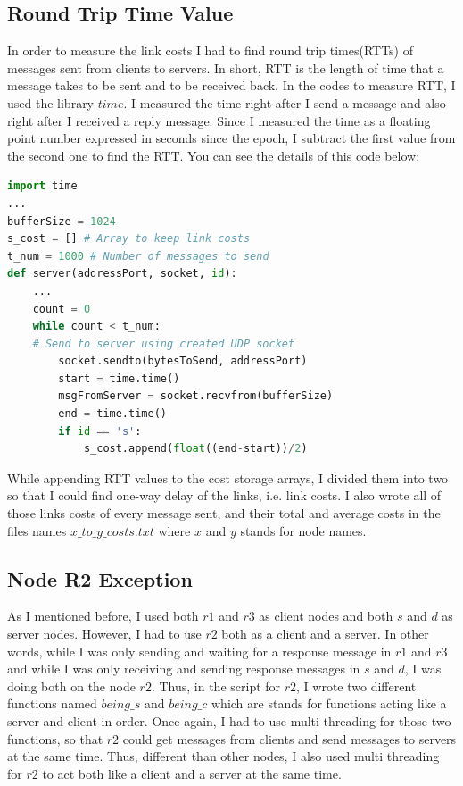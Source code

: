 \documentclass[conference]{IEEEtran}
\begin{document}
\subsection{Round Trip Time Value}
In order to measure the link costs I had to find round trip times(RTTs) of messages sent from clients to servers. In short, RTT is the length of time that a message takes to be sent and to be received back. In the codes to measure RTT, I used the library $time$. I measured the time right after I send a message and also right after I received a reply message. Since I measured the time as a floating point number expressed in seconds since the epoch, I subtract the first value from the second one to find the RTT. You can see the details of this code below:
\begin{lstlisting}[language=Python, caption=Finding RTT in Python]
import time
...
bufferSize = 1024
s_cost = [] # Array to keep link costs
t_num = 1000 # Number of messages to send
def server(addressPort, socket, id):
    ...
    count = 0
	while count < t_num:
	# Send to server using created UDP socket
		socket.sendto(bytesToSend, addressPort)
		start = time.time()
		msgFromServer = socket.recvfrom(bufferSize)
		end = time.time()
		if id == 's':
			s_cost.append(float((end-start))/2)
\end{lstlisting}

While appending RTT values to the cost storage arrays, I divided them into two so that I could find one-way delay of the links, i.e. link costs. I also wrote all of those links costs of every message sent, and their total and average costs in the files names $x\_to\_y\_costs.txt$ where $x$ and $y$ stands for node names.

\subsection{Node R2 Exception}
As I mentioned before, I used both $r1$ and $r3$ as client nodes and both $s$ and $d$ as server nodes. However, I had to use $r2$ both as a client and a server. In other words, while I was only sending and waiting for a response message in $r1$ and $r3$ and while I was only receiving and sending response messages in $s$ and $d$, I was doing both on the node $r2$. Thus, in the script for $r2$, I wrote two different functions named $being\_s$ and $being\_c$ which are stands for functions acting like a server and client in order. Once again, I had to use multi threading for those two functions, so that $r2$ could get messages from clients and send messages to servers at the same time. Thus, different than other nodes, I also used multi threading for $r2$ to act both like a client and a server at the same time.
\end{document}
